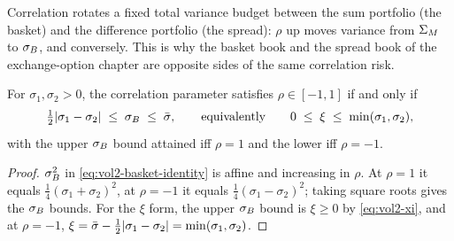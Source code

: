 Correlation rotates a fixed total variance budget between the sum portfolio
(the basket) and the difference portfolio (the spread): $\rho$ up moves
variance from $\Sigma_M$ to $\sigma_B$, and conversely. This is why the basket
book and the spread book of the exchange-option chapter are opposite sides
of the same correlation risk.

\begin{proposition}
\label{prop:vol2-rungs}
For $\sigma_1, \sigma_2 > 0$, the correlation parameter satisfies
$\rho \in [-1, 1]$ if and only if
\begin{equation}
\tfrac12\lvert\sigma_1 - \sigma_2\rvert \;\le\; \sigma_B \;\le\; \bar\sigma,
\qquad\text{equivalently}\qquad
0 \;\le\; \xi \;\le\; \min(\sigma_1, \sigma_2),
\label{eq:vol2-rungs}
\end{equation}
with the upper $\sigma_B$ bound attained iff $\rho = 1$ and the lower iff
$\rho = -1$.
\end{proposition}

\begin{proof}
$\sigma_B^2$ in \eqref{eq:vol2-basket-identity} is affine and increasing in
$\rho$. At $\rho = 1$ it equals $\tfrac14(\sigma_1+\sigma_2)^2$, at
$\rho = -1$ it equals $\tfrac14(\sigma_1-\sigma_2)^2$; taking square roots
gives the $\sigma_B$ bounds. For the $\xi$ form, the upper $\sigma_B$ bound is
$\xi \ge 0$ by \eqref{eq:vol2-xi}, and at $\rho = -1$,
$\xi = \bar\sigma - \tfrac12\lvert\sigma_1-\sigma_2\rvert = \min(\sigma_1,\sigma_2)$.
\end{proof}

